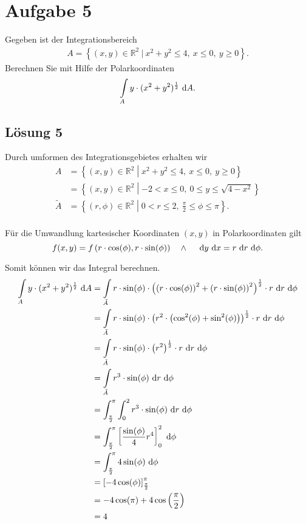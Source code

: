 \documentclass[main.tex]{subfiles}
\begin{document}
\section{Aufgabe 5}
Gegeben ist der Integrationsbereich
\begin{align*}
    A = \left\{ (x, y) \in \mathbb{R}^2 \ | \ x^2 + y^2 \leq 4, \ x \leq 0, \ y \geq 0 \right\}.
\end{align*}
Berechnen Sie mit Hilfe der Polarkoordinaten
\begin{align*}
    \int \limits_{A} y \cdot (x^2 + y^2)^{\frac{1}{2}} ~\mathrm{d}A.
\end{align*}

\subsection{Lösung 5}
Durch umformen des Integrationsgebietes erhalten wir
\begin{align*}
    A &= \left\{ (x, y) \in \mathbb{R}^2 \middle| x^2 + y^2 \leq 4, \ x \leq 0, \ y \geq 0 \right\}\\
      &= \left\{ (x, y) \in \mathbb{R}^2 \middle| -2 < x \leq 0, \ 0 \leq y \leq \sqrt{4-x^2} \right\}\\
    \tilde{A} &= \left\{ (r, \phi) \in \mathbb{R}^2 \middle| 0 < r \leq 2, \ \frac{\pi}{2} \leq \phi \leq \pi \right\}.\\
\end{align*}

Für die Umwandlung kartesischer Koordinaten $(x, y)$ in Polarkoordinaten gilt
$$
    f(x, y) = f\left(r\cdot \cos (\phi), r\cdot \sin (\phi)\right) \quad \wedge \quad ~\mathrm{d}y~\mathrm{d}x = r ~\mathrm{d}r ~\mathrm{d}\phi.
$$

Somit können wir das Integral berechnen.
\begin{align*}
    \int \limits_{A} y \cdot (x^2 + y^2)^{\frac{1}{2}} ~\mathrm{d}A
        &= \int \limits_{\tilde{A}} r\cdot \sin (\phi) \cdot \left(\left(r\cdot \cos (\phi)\right)^2 + \left(r\cdot \sin (\phi)\right)^2\right)^{\frac{1}{2}} \cdot r ~\mathrm{d}r ~\mathrm{d}\phi \\
        &= \int \limits_{\tilde{A}} r\cdot \sin (\phi) \cdot \left(r^2\cdot \left(\cos^2 (\phi) + \sin^2 (\phi)\right)\right)^{\frac{1}{2}} \cdot r ~\mathrm{d}r ~\mathrm{d}\phi \\
        &= \int \limits_{\tilde{A}} r\cdot \sin (\phi) \cdot \left(r^2\right)^{\frac{1}{2}} \cdot r ~\mathrm{d}r ~\mathrm{d}\phi \\
        &= \int \limits_{\tilde{A}} r^3 \cdot \sin (\phi) ~\mathrm{d}r ~\mathrm{d}\phi \\
        &= \int_{\frac{\pi}{2}}^{\pi} \int_{0}^{2} r^3 \cdot \sin (\phi) ~\mathrm{d}r ~\mathrm{d}\phi \\
        &= \int_{\frac{\pi}{2}}^{\pi} \left[ \frac{\sin (\phi)}{4} r^4 \right]_{0}^{2} ~\mathrm{d}\phi \\
        &= \int_{\frac{\pi}{2}}^{\pi} 4 \sin (\phi) ~\mathrm{d}\phi \\
        &= \left[ -4 \cos (\phi) \right]_{\frac{\pi}{2}}^{\pi} \\
        &= -4 \cos (\pi) +4 \cos \left(\frac{\pi}{2}\right) \\
        &= 4 \\
\end{align*}
\end{document}
